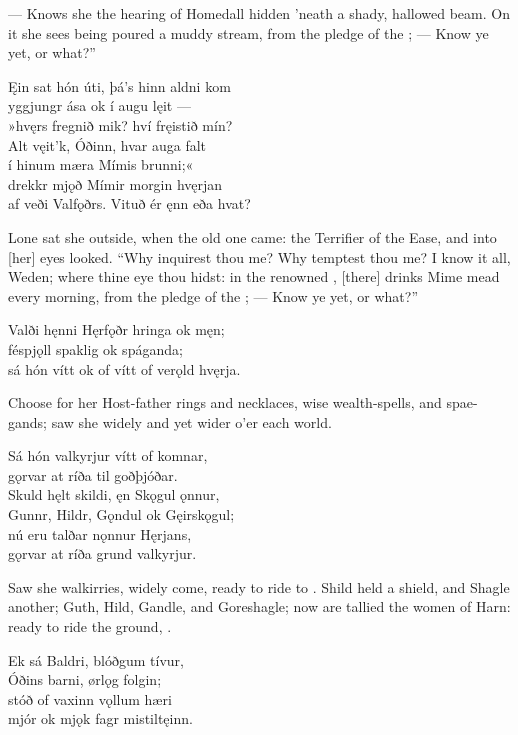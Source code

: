 \bvb — Knows she the hearing of Homedall hidden ’neath a shady\footnotemark[1], hallowed beam\footnotemark[2]. On it she sees being poured a muddy stream, from the pledge of the ; — Know ye yet, or what?”\evb
{}

\bva Ęin sat hón úti, \hld þá’s hinn aldni kom \\%
yggjungr ása \hld ok í augu lęit — \\%
»hvęrs fregnið mik? \hld hví fręistið mín? \\%
Alt vęit’k, Óðinn, \hld hvar auga falt \\%
í hinum mæra \hld Mímis brunni;« \\%
drekkr mjǫð Mímir \hld morgin hvęrjan \\%
af veði Valfǫðrs. \hld Vituð ér ęnn eða hvat?\eva

\bvb Lone sat she outside, when the old one came: the Terrifier of the Ease, and into [her] eyes looked. “Why inquirest thou me? Why temptest thou me? I know it all, Weden; where thine eye thou hidst: in the renowned , [there] drinks Mime mead every morning, from the pledge of the ; — Know ye yet, or what?”\evb

\bva Valði hęnni Hęrfǫðr \hld hringa ok męn; \\%
féspjǫll spaklig \hld ok spáganda; \\%
sá hón vítt ok of vítt \hld of verǫld hvęrja.\eva

\bvb Choose for her Host-father rings and necklaces, wise wealth-spells, and spae-gands; saw she widely and yet wider o’er each world.\evb

\bva Sá hón valkyrjur \hld vítt of komnar, \\%
gǫrvar at ríða \hld til goðþjóðar. \\%
Skuld hęlt skildi, \hld ęn Skǫgul ǫnnur, \\%
Gunnr, Hildr, Gǫndul \hld ok Gęirskǫgul; \\%
nú eru talðar \hld nǫnnur Hęrjans, \\%
gǫrvar at ríða \hld grund valkyrjur.\eva

\bvb Saw she walkirries, widely come, ready to ride to . Shild held a shield, and Shagle another; Guth, Hild, Gandle, and Goreshagle; now are tallied the women of Harn: ready to ride the ground, .\evb

\bva Ek sá Baldri, \hld blóðgum tívur, \\%
Óðins barni, \hld ørlǫg folgin; \\%
stóð of vaxinn \hld vǫllum hæri \\%
mjór ok mjǫk fagr \hld mistiltęinn.\eva

